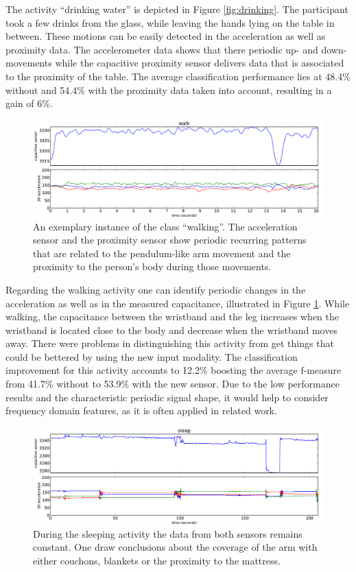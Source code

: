 \documentclass[runningheads,a4paper]{llncs}
\begin{document}
The activity ``drinking water'' is depicted in Figure \ref{fig:drinking}. The participant took a few drinks from the glass, while leaving the hands lying on the table in between. These motions can be easily detected in the acceleration as well as proximity data. The accelerometer data shows that there periodic up- and down-movements while the capacitive proximity sensor delivers data that is associated to the proximity of the table. The average classification performance lies at 48.4\% without and 54.4\% with the proximity data taken into account, resulting in a gain of 6\%.

\begin{figure}
	\centering
		\includegraphics[width=1.00\textwidth]{../Auswertung/images/marko_8.pdf}
	\caption{An exemplary instance of the class ``walking''. The acceleration sensor and the proximity sensor show periodic recurring patterns that are related to the pendulum-like arm movement and the proximity to the person's body during those movements.}
	\label{fig:walking}
\end{figure}

Regarding the walking activity one can identify periodic changes in the acceleration as well as in the measured capacitance, illustrated in Figure \ref{fig:walking}. While walking, the capacitance between the wristband and the leg increases when the wristband is located close to the body and decrease when the wristband moves away. There were problems in distinguishing this activity from get things that could be bettered by using the new input modality. The classification improvement for this activity accounts to 12.2\% boosting the average f-measure from 41.7\% without to 53.9\% with the new sensor. Due to the low performance results and the characteristic periodic signal shape, it would help to consider frequency domain features, as it is often applied in related work.

\begin{figure}
	\centering
		\includegraphics[width=1.00\textwidth]{../Auswertung/images/eugen_9.pdf}
	\caption{During the sleeping activity the data from both sensors remains constant. One draw conclusions about the coverage of the arm with either couchons, blankets or the proximity to the mattress.}
	\label{fig:sleeping}
\end{figure}
\end{document}
